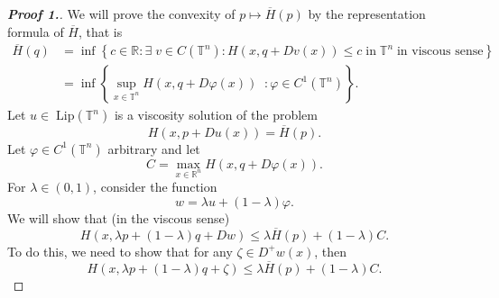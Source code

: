 \documentclass[12pt, oneside]{amsart}  	%
\begin{document}
\begin{proof}[\textbf{Proof 1.}] 
We will prove the convexity of $p\longmapsto\overline{H}(p)$ by the representation formula of $\overline{H}$, that is
\begin{align*}
\overline{H}(q) &= \inf \left\lbrace c\in \mathbb{R}: \exists\;v\in C(\mathbb{T}^n): H(x,q+Dv(x))\leq c\;\text{in}\;\mathbb{T}^n\;\text{in viscous sense}\right\rbrace \\
	            &= \inf\left\lbrace \sup_{x\in \mathbb{T}^n} H(x,q+D\varphi(x))\;\;:\varphi\in C^1(\mathbb{T}^n)\right\rbrace.
\end{align*}
Let $u\in\;\text{Lip}(\mathbb{T}^n)$ is a viscosity solution of the problem
\begin{equation}\label{Epp}
H(x,p+Du(x)) = \overline{H}(p) \tag{$E_p$}.
\end{equation}
Let $\varphi\in C^1(\mathbb{T}^n)$ arbitrary and let
\begin{equation*}
C = \max_{x\in \mathbb{R}^n} H(x,q+D\varphi(x)).
\end{equation*}
For $\lambda\in (0,1)$, consider the function
\begin{equation*}
w = \lambda u + (1-\lambda) \varphi.
\end{equation*}
We will show that (in the viscous sense)
\begin{equation}\label{Elambda p + 1-lambda q}
H\left(x,\lambda p +(1-\lambda)q+ Dw\right) \leq \lambda \overline{H}(p) + (1-\lambda)C .
\end{equation}
To do this, we need to show that for any $\zeta\in D^+w(x)$, then
\begin{equation*}
H\left(x,\lambda p +(1-\lambda)q+ \zeta\right) \leq \lambda \overline{H}(p) + (1-\lambda)C. 
\end{equation*}
\vspace*{0.1cm}

\end{proof}
\end{document}
